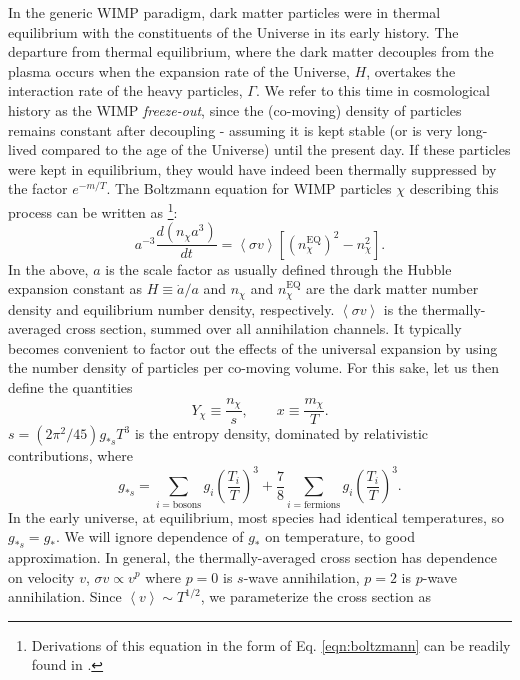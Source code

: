 In the generic WIMP paradigm, dark matter particles were in thermal equilibrium with the constituents of the Universe in its early history. The departure from thermal equilibrium, where the dark matter decouples from the plasma occurs when the expansion rate of the Universe, $H$, overtakes the interaction rate of the heavy particles, $\Gamma$. We refer to this time in cosmological history as the WIMP \textit{freeze-out}, since the (co-moving) density of particles remains constant after decoupling - assuming it is kept stable (or is very long-lived compared to the age of the Universe) until the present day. If these particles were kept in equilibrium, they would have indeed been thermally suppressed by the factor $e^{-m/T}$. The Boltzmann equation for WIMP particles $\chi$ describing this process can be written as \footnote{Derivations of this equation in the form of Eq. \ref{eqn:boltzmann} can be readily found in \cite{RN785, RN682, RN681}.}:
\begin{equation}
a^{-3} \frac{d \left( n_{\chi} a^3\right)}{dt} = \left \langle \sigma v \right \rangle \left[ (n^{\text{EQ}}_{\chi})^2-n_{\chi}^2 \right].
\label{eqn:boltzmann}
\end{equation}
In the above, $a$ is the scale factor as usually defined through the Hubble expansion constant as $H \equiv \dot{a}/a$ and $n_{\chi}$ and $n^{\text{EQ}}_{\chi}$ are the dark matter number density and equilibrium number density, respectively. $\left \langle \sigma v \right \rangle$ is the thermally-averaged cross section, summed over all annihilation channels. It typically becomes convenient to factor out the effects of the universal expansion by using the number density of particles per co-moving volume. For this sake, let us then define the quantities
\begin{equation}
Y_{\chi} \equiv \frac{n_{\chi}}{s}, \qquad x \equiv \frac{m_\chi}{T}.
\end{equation}
$s=(2\pi^2/45)g_{*s}T^3$ is the entropy density, dominated by relativistic contributions, where
\begin{equation}
g_{*s}=\sum_{i=\text{bosons}} g_i \left( \frac{T_i}{T}\right)^3 + \frac{7}{8} \sum_{i=\text{fermions}} g_i \left( \frac{T_i}{T}\right)^3.
\end{equation}
In the early universe, at equilibrium, most species had identical temperatures, so $g_{*s}=g_*$. We will ignore dependence of $g_*$ on temperature, to good approximation. In general, the thermally-averaged cross section has dependence on velocity $v$, $\sigma v \propto v^p$ where $p=0$ is $s$-wave annihilation, $p=2$ is $p$-wave annihilation. Since $\left \langle v \right \rangle \sim T^{1/2}$, we parameterize the cross section as
